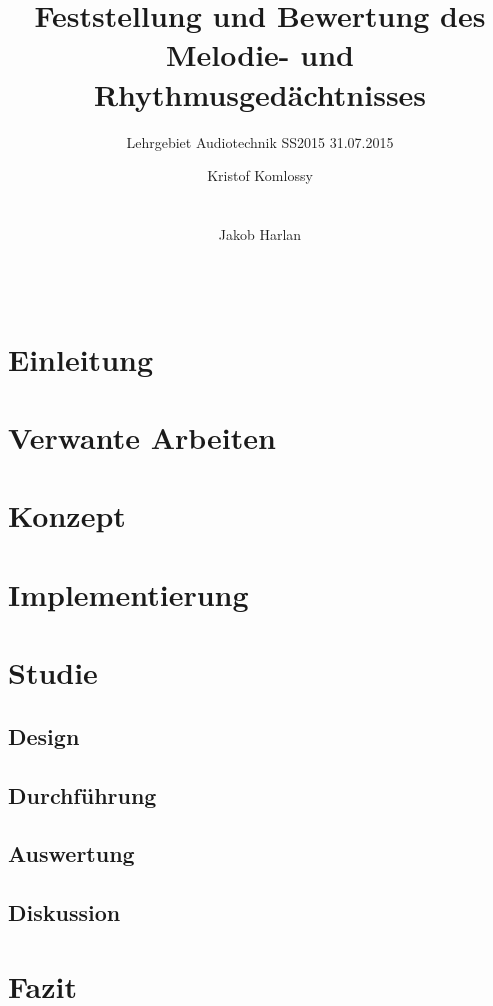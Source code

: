 \documentclass{acm_proc_article-sp}
\begin{document}
\title{Feststellung und Bewertung des Melodie- und Rhythmusgedächtnisses}
\subtitle{Lehrgebiet Audiotechnik SS2015 31.07.2015}

\author{
\alignauthor
Kristof Komlossy\\
       \\
       \\
\alignauthor
Jakob Harlan\\
       \\
       \\
} %

\maketitle

\begin{abstract}

\end{abstract}


\section{Einleitung}

\section{Verwante Arbeiten}

\section{Konzept}
\section{Implementierung}
\section{Studie}
\subsection{Design}
\subsection{Durchführung}
\subsection{Auswertung}
\subsection{Diskussion}
\section{Fazit}
\end{document}
